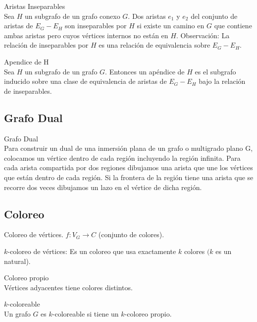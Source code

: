 \documentclass{article}
\begin{document}
\begin{defn}
Aristas Inseparables \\
Sea $H$ un subgrafo de un grafo conexo $G .$ Dos aristas $e_{1}$ y $e_{2}$ del conjunto de aristas de $E_{G}-E_{H}$ son inseparables por $H$ si existe un camino en $G$ que contiene ambas aristas pero cuyos vértices internos no están en $H$.
Observación:
La relación de inseparables por $H$ es una relación de equivalencia sobre $E_{G}-E_{H}$.
\end{defn}

\begin{defn}
Apendice de H \\ Sea $H$ un subgrafo de un grafo $G$. Entonces un apéndice de $H$ es el subgrafo inducido sobre una clase de equivalencia de aristas de $E_{G}-E_{H}$ bajo la relación de inseparables.
\end{defn}

\subsection{Grafo Dual}

\begin{defn}
Grafo Dual \\ Para construir un dual de una inmersión plana de un grafo o multigrado plano G, colocamos un vértice dentro de cada región incluyendo la región infinita. Para cada arista compartida por dos regiones dibujamos una arista que une los vértices que están dentro de cada región. Si la frontera de la región tiene una arista que se recorre dos veces dibujamos un lazo en el vértice de dicha región.
\end{defn}
 
\subsection{Coloreo}
Coloreo de vértices. $f: V_{G} \rightarrow C$ (conjunto de colores).

\begin{defn}
$k$-coloreo de vértices: Es un coloreo que usa exactamente $k$ colores $(k$ es un natural).
\end{defn}

\begin{defn}
Coloreo propio \\ Vértices adyacentes tiene colores distintos.
\end{defn}

\begin{defn}
$k$-coloreable \\ Un grafo $G$ es $k$-coloreable si tiene un $k$-coloreo propio.
\end{defn}
\end{document}
